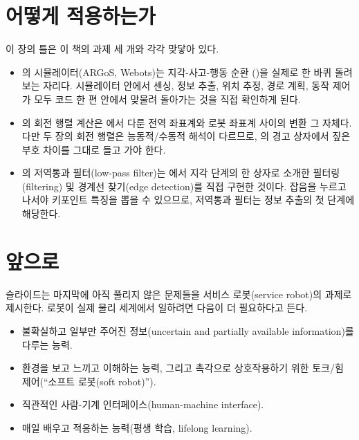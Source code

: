 \section{어떻게 적용하는가}
\label{sec:lec01-apply}

이 장의 틀은 이 책의 과제 세 개와 각각 맞닿아 있다.

\begin{itemize}
  \item {}의 시뮬레이터(ARGoS, Webots)는 지각-사고-행동 순환
    ()을 실제로 한 바퀴 돌려 보는 자리다.
    시뮬레이터 안에서 센싱, 정보 추출, 위치 추정, 경로 계획, 동작 제어가
    모두 코드 한 편 안에서 맞물려 돌아가는 것을 직접 확인하게 된다.
  \item {}의 회전 행렬 계산은 에서 다룬
    전역 좌표계와 로봇 좌표계 사이의 변환 그 자체다. 다만 두 장의 회전
    행렬은 능동적/수동적 해석이 다르므로, 의
    경고 상자에서 짚은 부호 차이를 그대로 들고 가야 한다.
  \item {}의 저역통과 필터(low-pass filter)는
    에서 지각 단계의 한 상자로 소개한 필터링
    (filtering) 및 경계선 찾기(edge detection)를 직접 구현한 것이다. 잡음을
    누르고 나서야 키포인트 특징을 뽑을 수 있으므로, 저역통과 필터는 정보
    추출의 첫 단계에 해당한다.
\end{itemize}

\section{앞으로}
\label{sec:lec01-future}

슬라이드는 마지막에 아직 풀리지 않은 문제들을 서비스 로봇(service robot)의
과제로 제시한다. 로봇이 실제 물리 세계에서 일하려면 다음이 더 필요하다고
든다. %

\begin{itemize}
  \item 불확실하고 일부만 주어진 정보(uncertain and partially available
    information)를 다루는 능력.
  \item 환경을 보고 느끼고 이해하는 능력, 그리고 촉각으로 상호작용하기 위한
    토크/힘 제어(``소프트 로봇(soft robot)'').
  \item 직관적인 사람-기계 인터페이스(human-machine interface).
  \item 매일 배우고 적응하는 능력(평생 학습, lifelong learning).
\end{itemize}

